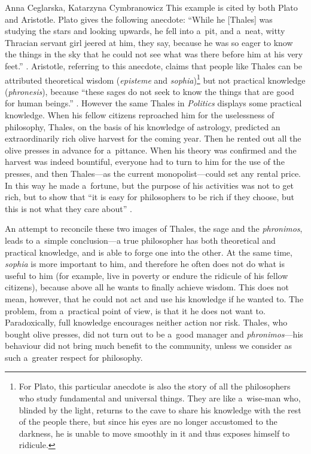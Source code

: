 \begin{artengenv2auth}{Anna Ceglarska, Katarzyna Cymbranowicz}
This example is cited by both Plato and Aristotle. Plato gives the following anecdote: ``While he [Thales] was studying the stars and looking upwards, he fell into a~pit, and a~neat, witty Thracian servant girl jeered at him, they say, because he was so eager to know the things in the sky that he could not see what was there before him at his very feet.'' 
\parencite[][ {174a}]{plato_plato_1921}. %
 Aristotle, referring to this anecdote, claims that people like Thales can be attributed theoretical wisdom (\textit{episteme} and \textit{sophia})\footnote{For Plato, this particular anecdote is also the story of all the philosophers who study fundamental and universal things. They are like a~wise-man who, blinded by the light, returns to the cave to share his knowledge with the rest of the people there, but since his eyes are no longer accustomed to the darkness, he is unable to move smoothly in it and thus exposes himself to ridicule.} but not practical knowledge (\textit{phronesis}), because ``these sages do not seek to know the things that are good for human beings.'' 
\parencite[][]{rackham_nicomachean_1934}. %
 However the same Thales in \textit{Politics} displays some practical knowledge. When his fellow citizens reproached him for the uselessness of philosophy, Thales, on the basis of his knowledge of astrology, predicted an extraordinarily rich olive harvest for the coming year. Then he rented out all the olive presses in advance for a~pittance. When his theory was confirmed and the harvest was indeed bountiful, everyone had to turn to him for the use of the presses, and then Thales---as the current monopolist---could set any rental price. In this way he made a~fortune, but the purpose of his activities was not to get rich, but to show that ``it is easy for philosophers to be rich if they choose, but this is not what they care about'' 
\parencite[][1.1259a]{aristotle_politics_1944}.%




An attempt to reconcile these two images of Thales, the sage and the \textit{phronimos}, leads to a~simple conclusion---a true philosopher has both theoretical and practical knowledge, and is able to forge one into the other. At the same time, \textit{sophia} is more important to him, and therefore he often does not do what is useful to him (for example, live in poverty or endure the ridicule of his fellow citizens), because above all he wants to finally achieve wisdom. This does not mean, however, that he could not act and use his knowledge if he wanted to. The problem, from a~practical point of view, is that it he does not want to. Paradoxically, full knowledge encourages neither action nor risk. Thales, who bought olive presses, did not turn out to be a~good manager and \textit{phronimos}---his behaviour did not bring much benefit to the community, unless we consider as such a~greater respect for philosophy.




\end{artengenv2auth}
